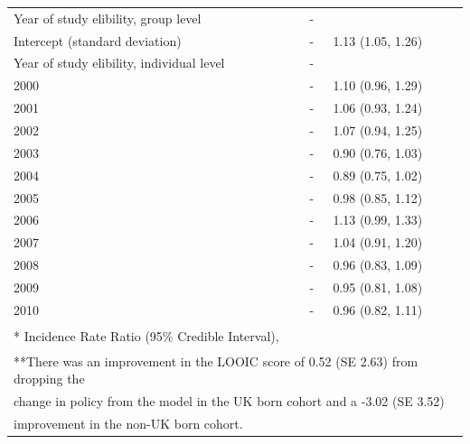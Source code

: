 \documentclass[11pt,twoside]{bristolthesis}
\begin{document}
\begin{table}[!h]
\begin{tabular}{lll}
  Year of study elibility, group level & - & \\
  \hspace{1em}Intercept (standard deviation) & - & 1.13 (1.05, 1.26)\\
  Year of study elibility, individual level & - & \\
  \addlinespace
  \hspace{1em}2000 & - & 1.10 (0.96, 1.29)\\
  \hspace{1em}2001 & - & 1.06 (0.93, 1.24)\\
  \hspace{1em}2002 & - & 1.07 (0.94, 1.25)\\
  \hspace{1em}2003 & - & 0.90 (0.76, 1.03)\\
  \hspace{1em}2004 & - & 0.89 (0.75, 1.02)\\
  \addlinespace
  \hspace{1em}2005 & - & 0.98 (0.85, 1.12)\\
  \hspace{1em}2006 & - & 1.13 (0.99, 1.33)\\
  \hspace{1em}2007 & - & 1.04 (0.91, 1.20)\\
  \hspace{1em}2008 & - & 0.96 (0.83, 1.09)\\
  \hspace{1em}2009 & - & 0.95 (0.81, 1.08)\\
  \addlinespace
  \hspace{1em}2010 & - & 0.96 (0.82, 1.11)\\
  \bottomrule
  \multicolumn{3}{l}{\textsuperscript{} * Incidence Rate Ratio (95\% Credible Interval),}\\
  \multicolumn{3}{l}{\textsuperscript{} **There was an improvement in the LOOIC score of 0.52 (SE 2.63) from dropping the}\\
  \multicolumn{3}{l}{change in policy from the model in the UK born cohort and a -3.02 (SE 3.52)}\\
  \multicolumn{3}{l}{improvement in the non-UK born cohort.}\\
  \end{tabular}
  \end{table}
\end{document}
